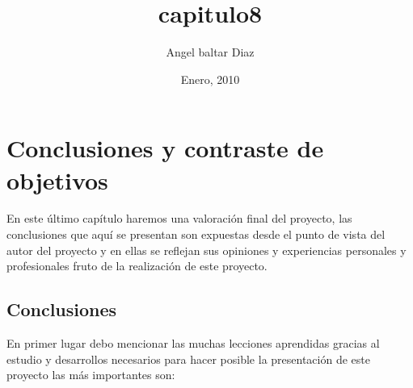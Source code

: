 


\title{capitulo8} 
\author{Angel baltar Diaz}
\date{\Large Enero, 2010} 

\chapter {Conclusiones y contraste de objetivos}
\label{capitulo8}

En este último capítulo haremos una valoración final del proyecto, las conclusiones que aquí se presentan son expuestas desde el punto de vista del autor del proyecto y en ellas se reflejan sus opiniones y experiencias personales y profesionales fruto de la realización de este proyecto.

\section{Conclusiones}

En primer lugar debo mencionar las muchas lecciones aprendidas gracias al estudio y desarrollos necesarios para hacer posible la presentación de este proyecto las más importantes son:

